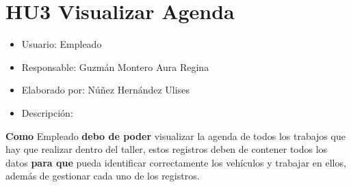 \section{HU3 Visualizar Agenda}
\begin{itemize}
	\item Usuario: Empleado
	\item Responsable: Guzmán Montero Aura Regina
	\item Elaborado por: Núñez Hernández Ulises
	\item Descripción:\\
\end{itemize}

\textbf{Como} Empleado \textbf{debo de poder} visualizar la agenda de todos los trabajos que hay que realizar dentro del taller, estos registros deben de contener todos los datos \textbf{para que} pueda identificar correctamente los vehículos y trabajar en ellos, además de gestionar cada uno de los registros.